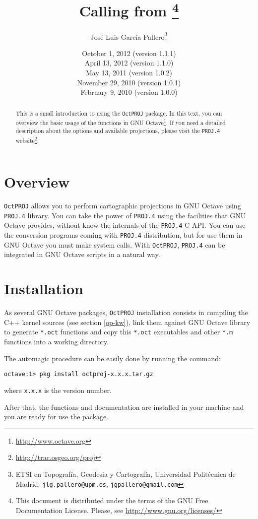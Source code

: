 \documentclass[10pt,a4paper]{article}
\title{\octproj\\Calling \proj{} from \octave\footnote{This document is
       distributed under the terms of the GNU Free Documentation License.
       Please, see \url{http://www.gnu.org/licenses/}}}
\author{Jos\'e Luis Garc\'ia Pallero\footnote{ETSI en Topograf\'ia, Geodesia y
        Cartograf\'ia, Universidad Polit\'ecnica de Madrid.
        \texttt{jlg.pallero@upm.es}, \texttt{jgpallero@gmail.com}}}
\date{October 1, 2012 (version 1.1.1)\\
      April 13, 2012 (version 1.1.0)\\
      May 13, 2011 (version 1.0.2)\\
      November 29, 2010 (version 1.0.1)\\
      February 9, 2010 (version 1.0.0)}
\newcommand{\octproj}{\texttt{OctPROJ}}
\newcommand{\proj}{\texttt{PROJ.4}}
\newcommand{\octave}{GNU Octave}
\begin{document}
\maketitle

\nocite{eat-om}
\nocite{projman}
\nocite{projir1}
\nocite{projir2}
\nocite{sny-wm}

\begin{abstract}
This is a small introduction to using the \octproj{} package. In this text, you
can overview the basic usage of the functions in
\octave\footnote{\url{http://www.octave.org}}. If you need a detailed
description about the options and available projections, please visit the
\proj{} website\footnote{\url{http://trac.osgeo.org/proj}}.
\end{abstract}

\section{Overview}

\octproj{} allows you to perform cartographic projections in \octave{} using
\proj{} library. You can take the power of \proj{} using the facilities that
\octave{} provides, without know the internals of the \proj{} C API. You can use
the conversion programs coming with \proj{} distribution, but for use them in
\octave{} you must make system calls. With \octproj{}, \proj{} can be integrated
in \octave{} scripts in a natural way.

\section{Installation}

As several \octave{} packages, \octproj{} installation consists in compiling the
C++ kernel sources (see section \ref{op-kw}), link them against \octave{}
library to generate \texttt{*.oct} functions and copy this \texttt{*.oct}
executables and other \texttt{*.m} functions into a working directory.

The automagic procedure can be easily done by running the command:

\begin{verbatim}
octave:1> pkg install octproj-x.x.x.tar.gz
\end{verbatim}
where \texttt{x.x.x} is the version number.

After that, the functions and documentation are installed in your machine and
you are ready for use the package.
\end{document}
